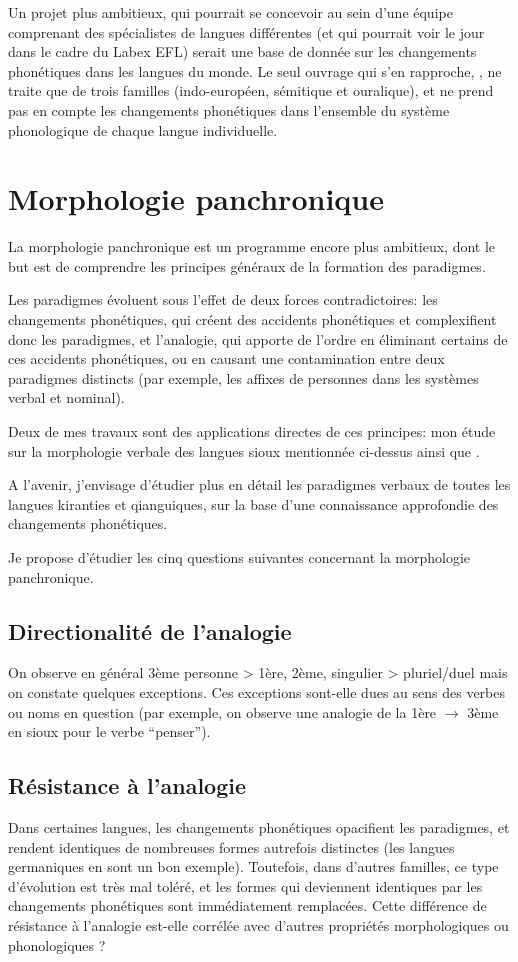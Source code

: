\documentclass[oldfontcommands,oneside,a4paper,11pt]{memoir}
\begin{document}
Un projet plus ambitieux, qui pourrait se concevoir au sein d'une équipe comprenant des spécialistes de langues différentes (et qui pourrait voir le jour dans le cadre du Labex EFL) serait une base de donnée sur les 
changements phonétiques dans les langues du monde. Le seul ouvrage qui s'en rapproche, \citet{kuemmel07wandel}, ne traite que de trois familles (indo-européen, sémitique et ouralique), et ne prend pas en compte les changements phonétiques dans l'ensemble du système phonologique de chaque langue individuelle.

\section{Morphologie panchronique} \label{sec:panchrm}
La morphologie panchronique est un programme encore plus ambitieux, dont le but est de comprendre les principes généraux de la formation des paradigmes. 
 
Les paradigmes évoluent sous l'effet de deux forces contradictoires: les changements phonétiques, qui créent des accidents phonétiques et complexifient donc les paradigmes, et l'analogie, qui apporte de l'ordre en éliminant certains de ces accidents phonétiques, ou en causant une contamination entre deux paradigmes distincts (par exemple, les affixes de personnes dans les systèmes verbal et nominal). 
 
Deux de mes travaux sont des applications directes de ces principes: mon étude sur la morphologie verbale des langues sioux mentionnée ci-dessus ainsi que \citet{jacques12agreement}.  

A l'avenir, j'envisage d'étudier plus en détail les paradigmes verbaux de toutes les langues kiranties et qianguiques, sur la base d'une connaissance approfondie des changements phonétiques. 
 
Je propose d'étudier les cinq questions suivantes concernant la morphologie panchronique.

\subsection{Directionalité de l'analogie}
On observe en général 3ème personne > 1ère, 2ème, singulier > pluriel/duel mais on constate quelques exceptions. Ces exceptions sont-elle dues au sens des verbes ou noms en question (par exemple, on observe une analogie de la 1ère $\rightarrow $ 3ème en sioux pour le verbe ``penser''). 
\subsection{Résistance à l'analogie}
  Dans certaines langues, les changements phonétiques opacifient les paradigmes, et rendent identiques de nombreuses formes autrefois distinctes (les langues germaniques en sont un bon exemple). Toutefois, dans d'autres familles, ce type d'évolution est très mal toléré, et les formes qui deviennent identiques par les changements phonétiques sont immédiatement remplacées.  Cette différence de résistance à l'analogie est-elle corrélée avec d'autres propriétés morphologiques ou phonologiques ?
\end{document}
